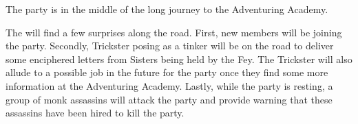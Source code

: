 The party is in the middle of the long journey to the Adventuring Academy.

The will find a few surprises along the road.
First, new members will be joining the party.
Secondly, Trickster posing as a tinker will be on the road to deliver some enciphered letters from Sisters being held by the Fey.
The Trickster will also allude to a possible job in the future for the party once they find some more information at the Adventuring Academy.
Lastly, while the party is resting, a group of monk assassins will attack the party and provide warning that these assassins have been hired to kill the party.